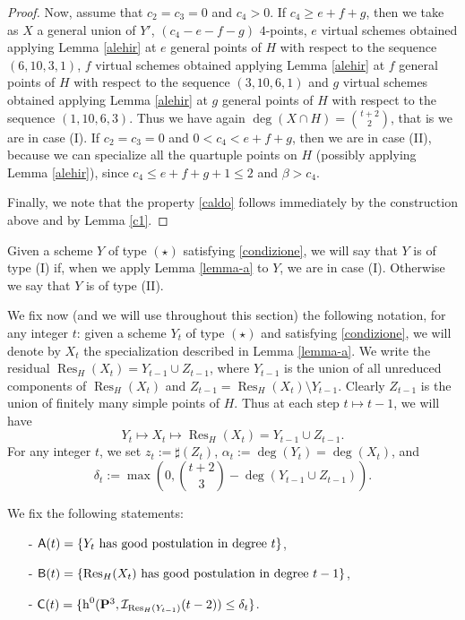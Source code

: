 \documentclass{amsart}
\theoremstyle{plain}
\theoremstyle{definition}
\begin{document}
\begin{proof}
Now, assume that $c_2=c_3=0$ and $c_4>0$.
If $c_4\ge e+f+g$, then
we take as $X$ a general union
of $Y'$, $(c_4-e-f-g)$ $4$-points, $e$ virtual schemes obtained applying
Lemma \ref{alehir} at $e$ general points of $H$ with respect to the
sequence $(6,10,3,1)$,
$f$ virtual schemes obtained applying Lemma \ref{alehir} at $f$
general points of $H$ with respect to the sequence $(3,10,6,1)$ and
$g$ virtual schemes obtained applying Lemma \ref{alehir} at $g$
general points of $H$ with respect to the sequence $(1,10,6,3)$.
Thus we have again $\deg(X\cap H)=\binom{t+2}{2}$, that is we are in case (I).
If $c_2=c_3=0$ and  $0<c_4<e+f+g$, then we are in case
(II), because we can specialize all the quartuple points on $H$
(possibly applying Lemma \ref{alehir}), since
$c_4\le e+f+g+1\le 2$ and $\beta>c_4$.

Finally, we note that the property \eqref{caldo} follows immediately by
the construction above and by Lemma \ref{c1}.
\end{proof}

Given a scheme $Y$ of type $(\star)$ satisfying
\eqref{condizione}, we will say that $Y$ is of type
(I) if, when we apply Lemma \ref{lemma-a} to $Y$, we are in case
(I). Otherwise we say that $Y$ is of type (II).

We fix now (and we will use throughout this section)
the following notation, for any integer $t$:
given a scheme $Y_t$ of type $(\star)$ and satisfying
\eqref{condizione}, we will denote by $X_t$ the
specialization described in Lemma \ref{lemma-a}.
We write the residual $\operatorname{Res}_H(X_t)=Y_{t-1}\cup Z_{t-1}$,
where $Y_{t-1}$ is the union of all unreduced components of
$\operatorname{Res}_H(X_t)$ and $Z_{t-1}=\operatorname{Res}_H(X_t)\setminus Y_{t-1}$.
Clearly  $Z_{t-1}$ is the union of finitely many simple points of
$H$.
Thus at each step $t \mapsto t-1$, we will have
$$Y_t \mapsto X_t \mapsto  \operatorname{Res}_H(X_t)= Y_{t-1}\cup Z_{t-1}.$$
For any integer $t$, we set $z_{t}:= \sharp (Z_{t})$,
$\alpha_{t}:=\deg(Y_{t})=\deg(X_{t})$, and
$$\delta_t:=\max\left(0,\binom{t+2}{3} -\deg(Y_{t-1}\cup
Z_{t-1})\right).$$

We fix the following statements:
\begin{itemize}
\item[-] ${\sf{{A}}}(t)=\{Y_t \mbox{ has good postulation in degree $t$}\}$,
\item[-] ${\sf{B}}(t)=\{\operatorname{Res}_H(X_t) \mbox{ has good postulation in degree $t-1$}\}$,
\item[-] ${\sf{C}}(t)=\{\operatorname{h}^0({\bf {P}}^3,\mathcal {I}_{\operatorname{Res}_H(Y_{t-1})}(t-2)) \le \delta_t\}$.
\end{itemize}
\end{document}
